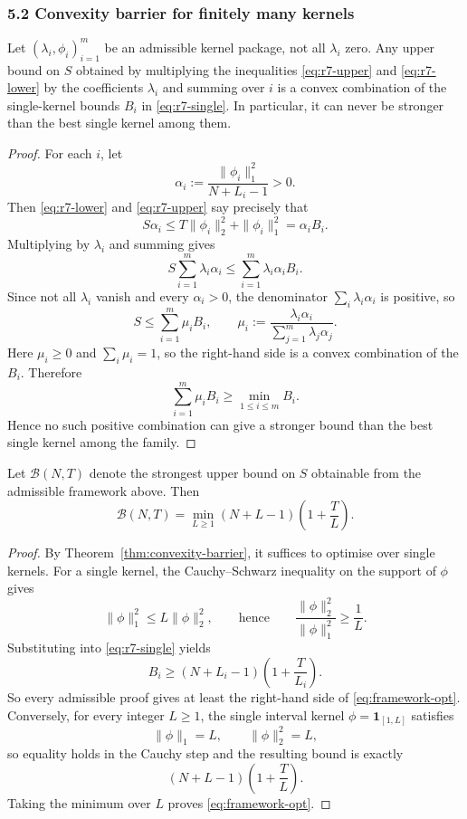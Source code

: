 \subsubsection{5.2 Convexity barrier for finitely many kernels}

\begin{theorem}
\label{thm:convexity-barrier}
Let $(\lambda_i,\phi_i)_{i=1}^m$ be an admissible kernel package, not all $\lambda_i$ zero.  Any upper bound on $S$ obtained by multiplying the inequalities \eqref{eq:r7-upper} and \eqref{eq:r7-lower} by the coefficients $\lambda_i$ and summing over $i$ is a convex combination of the single-kernel bounds $B_i$ in \eqref{eq:r7-single}.  In particular, it can never be stronger than the best single kernel among them.
\end{theorem}

\begin{proof}
For each $i$, let
\[
\alpha_i:=\frac{\|\phi_i\|_1^2}{N+L_i-1}>0.
\]
Then \eqref{eq:r7-lower} and \eqref{eq:r7-upper} say precisely that
\[
S\alpha_i\le T\|\phi_i\|_2^2+\|\phi_i\|_1^2=\alpha_i B_i.
\]
Multiplying by $\lambda_i$ and summing gives
\[
S\sum_{i=1}^m \lambda_i\alpha_i \le \sum_{i=1}^m \lambda_i\alpha_i B_i.
\]
Since not all $\lambda_i$ vanish and every $\alpha_i>0$, the denominator $\sum_i\lambda_i\alpha_i$ is positive, so
\[
S\le \sum_{i=1}^m \mu_i B_i,
\qquad
\mu_i:=\frac{\lambda_i\alpha_i}{\sum_{j=1}^m\lambda_j\alpha_j}.
\]
Here $\mu_i\ge 0$ and $\sum_i\mu_i=1$, so the right-hand side is a convex combination of the $B_i$.
Therefore
\[
\sum_{i=1}^m \mu_i B_i\ge \min_{1\le i\le m} B_i.
\]
Hence no such positive combination can give a stronger bound than the best single kernel among the family.
\end{proof}

\begin{corollary}
\label{cor:exact-framework-optimum}
Let $\mathcal B(N,T)$ denote the strongest upper bound on $S$ obtainable from the admissible framework above.  Then
\begin{equation}
\label{eq:framework-opt}
\mathcal B(N,T)=\min_{L\ge 1}(N+L-1)\left(1+\frac{T}{L}\right).
\end{equation}
\end{corollary}

\begin{proof}
By Theorem~\ref{thm:convexity-barrier}, it suffices to optimise over single kernels.
For a single kernel, the Cauchy--Schwarz inequality on the support of $\phi$ gives
\[
\|\phi\|_1^2\le L\|\phi\|_2^2,
\qquad\text{hence}\qquad
\frac{\|\phi\|_2^2}{\|\phi\|_1^2}\ge \frac1L.
\]
Substituting into \eqref{eq:r7-single} yields
\[
B_i\ge (N+L_i-1)\left(1+\frac{T}{L_i}\right).
\]
So every admissible proof gives at least the right-hand side of \eqref{eq:framework-opt}.
Conversely, for every integer $L\ge 1$, the single interval kernel $\phi=\mathbf 1_{[1,L]}$ satisfies
\[
\|\phi\|_1=L,\qquad \|\phi\|_2^2=L,
\]
so equality holds in the Cauchy step and the resulting bound is exactly
\[
(N+L-1)\left(1+\frac{T}{L}\right).
\]
Taking the minimum over $L$ proves \eqref{eq:framework-opt}.
\end{proof}

